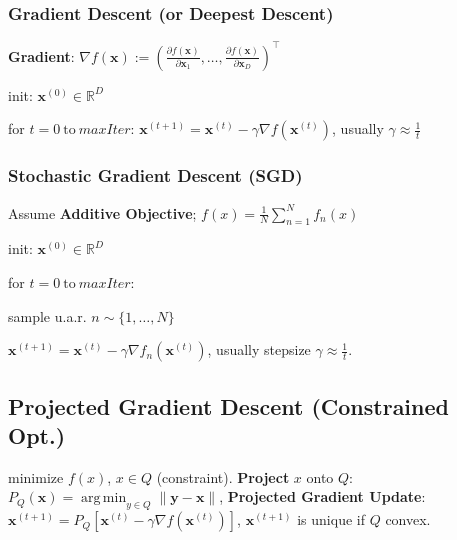 \documentclass[a4paper, 11pt, landscape]{article}
\DeclareMathOperator*{\argmin}{arg\,min}
\begin{document}
\begin{multicols*}{3}
\subsubsection{Gradient Descent (or Deepest Descent)}
\textbf{Gradient}: $\nabla f(\mathbf{x}) := \left( \frac{\partial f(\mathbf{x})}{\partial \mathbf{x}_1}, \ldots, \frac{\partial f(\mathbf{x})}{\partial \mathbf{x}_D} \right)^\top$
\begin{inparaenum}
	\item init: $\mathbf{x}^{(0)} \in \mathbb{R}^D$
	\item for $t = 0 \ \text{to} \ \mathit{maxIter}$: $\mathbf{x}^{(t+1)} = \mathbf{x}^{(t)} - \gamma \nabla f(\mathbf{x}^{(t)})$, usually $\gamma \approx \frac{1}{t}$
\end{inparaenum}

\subsubsection{Stochastic Gradient Descent (SGD)}
Assume \textbf{Additive Objective}; $f(x) = \frac{1}{N}\sum_{n=1}^{N}f_n(x)$
\begin{inparaenum}
	\item init: $\mathbf{x}^{(0)} \in \mathbb{R}^D$
	\item for $t = 0 \ \text{to} \ \mathit{maxIter}$:
	\item sample u.a.r. $n \sim \{1, \ldots, N\}$
	\item $\mathbf{x}^{(t+1)} = \mathbf{x}^{(t)} - \gamma \nabla f_n(\mathbf{x}^{(t)})$, usually stepsize $\gamma \approx \frac{1}{t}$.
\end{inparaenum}

\subsection{Projected Gradient Descent (Constrained Opt.)}
minimize $f(x)$, $x \in Q$ (constraint).
\textbf{Project} $x$ onto $Q$: $P_Q(\mathbf{x}) = \argmin_{y \in Q} \|\mathbf{y} - \mathbf{x}\|$,
\textbf{Projected Gradient Update}: $\mathbf{x}^{(t+1)} = P_Q[\mathbf{x}^{(t)} - \gamma \nabla f(\mathbf{x}^{(t)})]$,
$\mathbf{x}^{(t+1)}$ is unique if $Q$ convex.


\end{multicols*}
\end{document}
